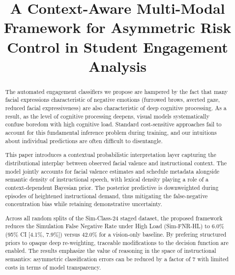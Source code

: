 \documentclass[conference]{IEEEtran}
\begin{document}
\title{A Context-Aware Multi-Modal Framework for Asymmetric Risk Control in Student Engagement Analysis}

\author{
}

\maketitle

\begin{abstract}
The automated engagement classifiers we propose are hampered by the fact that many facial expressions characteristic of negative emotions (furrowed brows, averted gaze, reduced facial expressiveness) are also characteristic of deep cognitive processing. As a result, as the level of cognitive processing deepens, visual models systematically confuse boredom with high cognitive load. Standard cost-sensitive approaches fail to account for this fundamental inference problem during training, and our intuitions about individual predictions are often difficult to disentangle.

This paper introduces a contextual probabilistic interpretation layer capturing the distributional interplay between observed facial valence and instructional context. The model jointly accounts for facial valence estimates and schedule metadata alongside semantic density of instructional speech, with lexical density playing a role of a context-dependent Bayesian prior. The posterior predictive is downweighted during episodes of heightened instructional demand, thus mitigating the false-negative concentration bias while retaining demonstrative uncertainty.

Across all random splits of the Sim-Class-24 staged dataset, the proposed framework reduces the Simulation False Negative Rate under High Load (Sim-FNR-HL) to 6.0\% (95\% CI [4.1\%, 7.9\%]) versus 42.0\% for a vision-only baseline. By prefering structured priors to opaque deep re-weighting, traceable modifications to the decision function are enabled. The results emphasize the value of reasoning in the space of instructional semantics: asymmetric classification errors can be reduced by a factor of 7 with limited costs in terms of model transparency.
\end{abstract}
\end{document}
